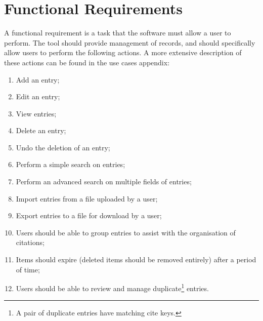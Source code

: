 \section{Functional Requirements}
\label{funcReq}
A functional requirement is a task that the software must allow a user to perform.  The tool should provide management of \bibtex{} records, and should specifically allow users to perform the following actions.  A more extensive description of these actions can be found in the use cases appendix:
\begin{enumerate}
\item Add an entry;
\item Edit an entry;
\item View entries;
\item Delete an entry;
\item Undo the deletion of an entry;
\item Perform a simple search on entries;
\item Perform an advanced search on multiple fields of entries;
\item Import entries from a file uploaded by a user;
\item Export entries to a file for download by a user;
\item Users should be able to group entries to assist with the organisation of citations;
\item Items should expire (deleted items should be removed entirely) after a period of time;
\item Users should be able to review and manage duplicate\footnote{A pair of duplicate entries have matching cite keys.} entries.
\end{enumerate}

